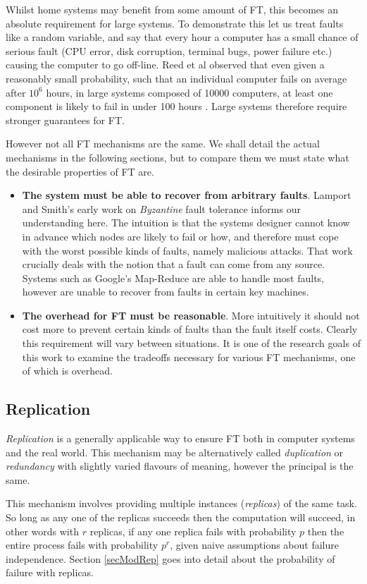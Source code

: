 Whilst home systems may benefit from some amount of FT, this becomes an absolute requirement for large systems.
To demonstrate this let us treat faults like a random variable, and say that every hour a computer has a small chance of serious fault (CPU error, disk corruption, terminal bugs, power failure etc.) causing the computer to go off-line.
Reed et al observed that even given a reasonably small probability, such that an individual computer fails on average after $10^6$ hours, in large systems composed of 10000 computers, at least one component is likely to fail in under 100 hours \cite{ree06}.
Large systems therefore require stronger guarantees for FT.

However not all FT mechanisms are the same.
We shall detail the actual mechanisms in the following sections, but to compare them we must state what the desirable properties of FT are.
\begin{itemize}
	\item	{\bf The system must be able to recover from arbitrary faults}.
			Lamport and Smith's early work on {\em Byzantine} fault tolerance \cite{lam86} informs our understanding here.
			The intuition is that the systems designer cannot know in advance which nodes are likely to fail or how, and therefore must cope with the worst possible kinds of faults, namely malicious attacks.
			That work crucially deals with the notion that a fault can come from any source.
			Systems such as Google's Map-Reduce \cite{dea08} are able to handle most faults, however are unable to recover from faults in certain key machines.
	\item	{\bf The overhead for FT must be reasonable}.
			More intuitively it should not cost more to prevent certain kinds of faults than the fault itself costs.
			Clearly this requirement will vary between situations.
			It is one of the research goals of this work to examine the tradeoffs necessary for various FT mechanisms, one of which is overhead.
\end{itemize}

\subsection{Replication}
{\em Replication} is a generally applicable way to ensure FT both in computer systems and the real world.
This mechanism may be alternatively called {\em duplication} or {\em redundancy} with slightly varied flavours of meaning, however the principal is the same.

This mechanism involves providing multiple instances ({\em replicas}) of the same task.
So long as any one of the replicas succeeds then the computation will succeed, in other words with $r$ replicas, if any one replica fails with probability $p$ then the entire process fails with probability $p^r$, given naive assumptions about failure independence.
Section \ref{secModRep} goes into detail about the probability of failure with replicas.


